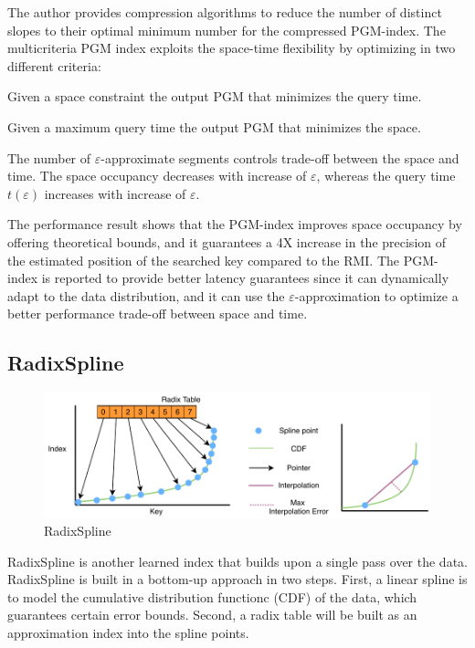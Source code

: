  The author provides compression algorithms to reduce the number of distinct slopes to their optimal minimum number for the compressed PGM-index. The multicriteria PGM index exploits the space-time flexibility by optimizing in two different criteria: 
\begin{enumerate*}
  \item Given a space constraint the output PGM that minimizes the query time.
  \item Given a maximum query time the output PGM that minimizes the space.
\end{enumerate*}
The number of $\varepsilon$-approximate segments controls trade-off between the space and time. The space occupancy decreases with increase of $\varepsilon$, whereas the query time ${t(\varepsilon)}$ increases with increase of $\varepsilon$. 

The performance result shows that the PGM-index improves space occupancy by offering theoretical bounds, and it guarantees a 4X increase in the precision of the estimated position of the searched key compared to the RMI. The PGM-index is reported to provide better latency guarantees since it can dynamically adapt to the data distribution, and it can use the ${\varepsilon}$-approximation to optimize a better performance trade-off between space and time.


\subsection{RadixSpline}

\begin{figure}[ht]
\centering
\includegraphics[width=\textwidth]{Figures/radixspline.pdf}
\caption{RadixSpline}
\label{fig:radixspline}
\end{figure}

RadixSpline \cite{Kipf:2020wr} is another learned index that builds upon a single pass over the data. RadixSpline is built in a bottom-up approach in two steps. First, a linear spline is to model the cumulative distribution functionc (CDF) of the data, which guarantees certain error bounds. Second, a radix table will be built as an approximation index into the spline points. 

